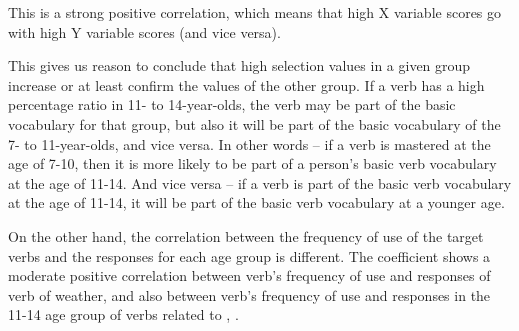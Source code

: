 \documentclass[output=paper,colorlinks,citecolor=brown]{langscibook}
\begin{document}
This is a strong positive correlation, which means that high X variable scores go with high Y variable scores (and vice versa).

This gives us reason to conclude that high selection values in a given group increase or at least confirm the values of the other group. If a verb has a high percentage ratio in 11- to 14-year-olds, the verb may be part of the basic vocabulary for that group, but also it will be part of the basic vocabulary of the 7- to 11-year-olds, and vice versa. In other words -- if a verb is mastered at the age of 7-10, then it is more likely to be part of a person's basic verb vocabulary at the age of 11-14. And vice versa -- if a verb is part of the basic verb vocabulary at the age of 11-14, it will be part of the basic verb vocabulary at a younger age.

On the other hand, the correlation between the frequency of use of the target verbs and the responses for each age group is different. The coefficient shows a moderate positive correlation between verb's frequency of use and responses of verb of weather, and also between verb's frequency of use and responses in the 11-14 age group of verbs related to , . 

\end{document}
